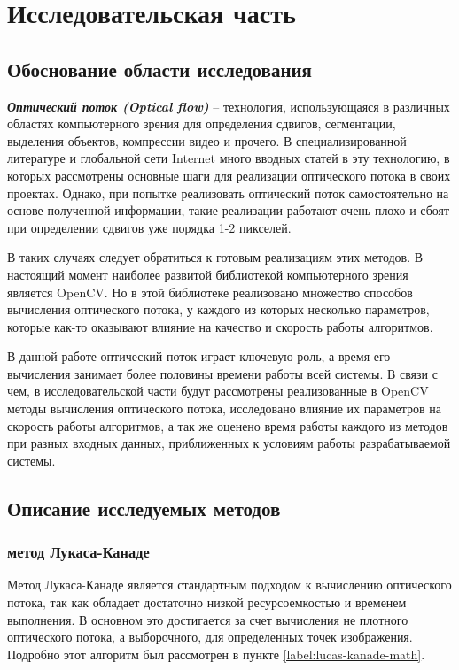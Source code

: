 \newpage
\section{Исследовательская часть}
\subsection{Обоснование области исследования}
\textit{\textbf{Оптический поток (Optical flow)}} – технология, использующаяся в различных областях компьютерного зрения для определения сдвигов, сегментации, выделения объектов, компрессии видео и прочего. В специализированной литературе и глобальной сети Internet много вводных статей в эту технологию, в которых рассмотрены основные шаги для реализации оптического потока в своих проектах. Однако, при попытке реализовать оптический поток самостоятельно на основе полученной информации, такие реализации  работают очень плохо и сбоят при определении сдвигов уже порядка 1-2 пикселей.

В таких случаях следует обратиться к готовым реализациям этих методов. В настоящий момент наиболее развитой библиотекой компьютерного зрения является OpenCV\cite{wikiOpenCV}. Но в этой библиотеке реализовано множество способов вычисления оптического потока, у каждого из которых несколько параметров, которые как-то оказывают влияние на качество и скорость работы алгоритмов. 

В данной работе оптический поток играет ключевую роль, а время его вычисления занимает более половины времени работы всей системы. В связи с чем, в исследовательской части будут рассмотрены реализованные в OpenCV методы вычисления оптического потока, исследовано влияние их параметров на скорость работы алгоритмов, а так же оценено время работы каждого из методов при разных входных данных, приближенных к условиям работы разрабатываемой системы.

\subsection{Описание исследуемых методов}
\subsubsection{метод Лукаса-Канаде}
Метод Лукаса-Канаде является стандартным подходом к вычислению оптического потока, так как обладает достаточно низкой ресурсоемкостью и временем выполнения. В основном это достигается за счет вычисления не плотного оптического потока, а выборочного, для определенных точек изображения. Подробно этот алгоритм был рассмотрен в пункте \ref{label:lucas-kanade-math}. 

